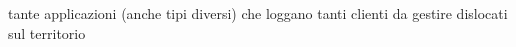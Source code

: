 tante applicazioni (anche tipi diversi) che loggano
tanti clienti da gestire dislocati sul territorio